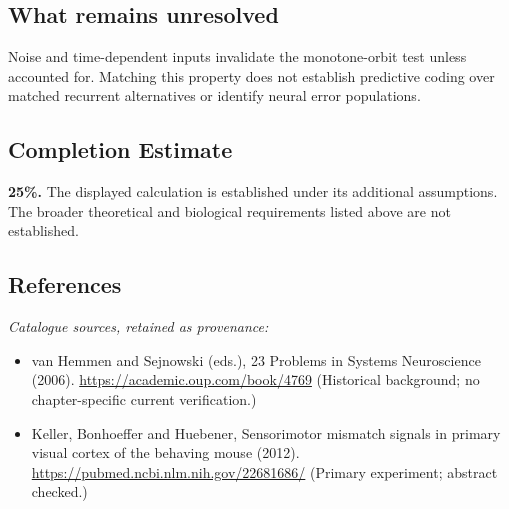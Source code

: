 \documentclass[11pt]{article}
\begin{document}
\subsection{What remains unresolved}
Noise and time-dependent inputs invalidate the monotone-orbit test unless accounted for. Matching this property does not establish predictive coding over matched recurrent alternatives or identify neural error populations.
\subsection{Completion Estimate}
\textbf{25\%.} The displayed calculation is established under its additional assumptions. The broader theoretical and biological requirements listed above are not established.
\subsection{References}
\noindent\emph{Catalogue sources, retained as provenance:}
\begin{itemize}
\item van Hemmen and Sejnowski (eds.), 23 Problems in Systems Neuroscience (2006). \url{https://academic.oup.com/book/4769} (Historical background; no chapter-specific current verification.)
\item Keller, Bonhoeffer and Huebener, Sensorimotor mismatch signals in primary visual cortex of the behaving mouse (2012). \url{https://pubmed.ncbi.nlm.nih.gov/22681686/} (Primary experiment; abstract checked.)
\end{itemize}
\clearpage


\appendix
\end{document}
